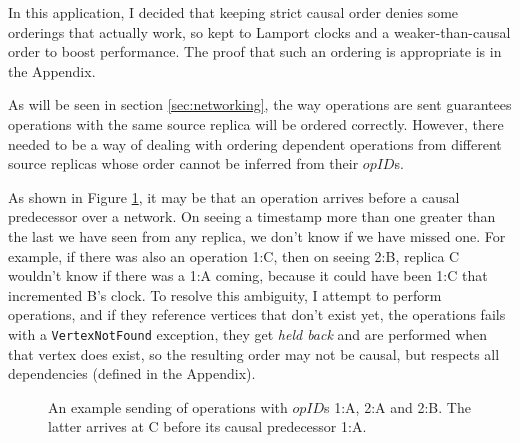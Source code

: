 \documentclass[diss.tex]{subfiles}
\begin{document}
In this application, I decided that keeping strict causal order denies some orderings that actually work, so kept to Lamport clocks and a weaker-than-causal order to boost performance. The proof that such an ordering is appropriate is in the Appendix.

As will be seen in section \ref{sec:networking}, the way operations are sent guarantees operations with the same source replica will be ordered correctly. However, there needed to be a way of dealing with ordering dependent operations from different source replicas whose order cannot be inferred from their $opID$s.

As shown in Figure \ref{fig:deliveryorder}, it may be that an operation arrives before a causal predecessor over a network. On seeing a timestamp more than one greater than the last we have seen from any replica, we don't know if we have missed one. For example, if there was also an operation 1:C, then on seeing 2:B, replica C wouldn't know if there was a 1:A coming, because it could have been 1:C that incremented B's clock. To resolve this ambiguity, I attempt to perform operations, and if they reference vertices that don't exist yet, the operations fails with a \texttt{VertexNotFound} exception, they get \textit{held back} and are performed when that vertex does exist, so the resulting order may not be causal, but respects all dependencies (defined in the Appendix).

\begin{figure}[H]
\centering
{}
\caption{An example sending of operations with $opID$s 1:A, 2:A and 2:B. The latter arrives at C before its causal predecessor 1:A.}
\label{fig:deliveryorder}
\end{figure}
\end{document}
